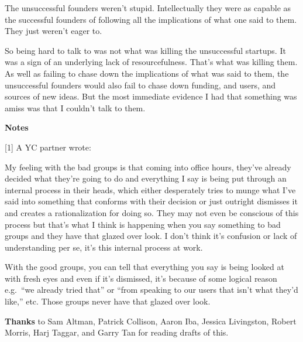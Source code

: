 The unsuccessful founders weren't stupid. Intellectually they were as
capable as the successful founders of following all the implications of
what one said to them. They just weren't eager to.

So being hard to talk to was not what was killing the unsuccessful
startups. It was a sign of an underlying lack of resourcefulness. That's
what was killing them. As well as failing to chase down the implications
of what was said to them, the unsuccessful founders would also fail to
chase down funding, and users, and sources of new ideas. But the most
immediate evidence I had that something was amiss was that I couldn't
talk to them.

\textbf{Notes}

{[}1{]} A YC partner wrote:

My feeling with the bad groups is that coming into office hours, they've
already decided what they're going to do and everything I say is being
put through an internal process in their heads, which either desperately
tries to munge what I've said into something that conforms with their
decision or just outright dismisses it and creates a rationalization for
doing so. They may not even be conscious of this process but that's what
I think is happening when you say something to bad groups and they have
that glazed over look. I don't think it's confusion or lack of
understanding per se, it's this internal process at work.

With the good groups, you can tell that everything you say is being
looked at with fresh eyes and even if it's dismissed, it's because of
some logical reason e.g.~``we already tried that'' or ``from speaking to
our users that isn't what they'd like,'' etc. Those groups never have
that glazed over look.

\textbf{Thanks} to Sam Altman, Patrick Collison, Aaron Iba, Jessica
Livingston, Robert Morris, Harj Taggar, and Garry Tan for reading drafts
of this.
